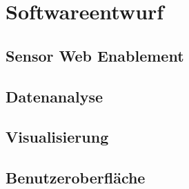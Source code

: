 \chapter{Softwareentwurf}
\section{Sensor Web Enablement}
\section{Datenanalyse}
\section{Visualisierung}
\section{Benutzeroberfläche}


